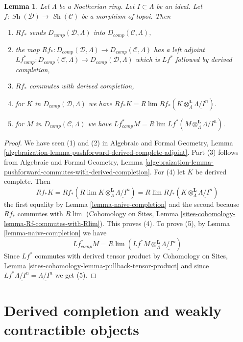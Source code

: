 \documentclass{stacks-project}
\theoremstyle{plain}
\newtheorem{lemma}[subsection]{Lemma}
\theoremstyle{definition}
\theoremstyle{remark}
\numberwithin{equation}{subsection}
\def\lim{\mathop{\mathrm{lim}}\nolimits}
\def\Sh{\mathop{\mathit{Sh}}\nolimits}
\begin{document}
\begin{lemma}
\label{lemma-pushforward-Noetherian-case}
Let $\Lambda$ be a Noetherian ring. Let $I \subset \Lambda$ be an ideal.
Let $f : \Sh(\mathcal{D}) \to \Sh(\mathcal{C})$ be a morphism of topoi.
Then
\begin{enumerate}
\item $Rf_*$ sends $D_{comp}(\mathcal{D}, \Lambda)$
into $D_{comp}(\mathcal{C}, \Lambda)$,
\item the map $Rf_* : D_{comp}(\mathcal{D}, \Lambda) \to
D_{comp}(\mathcal{C}, \Lambda)$ has a left adjoint
$Lf_{comp}^* : D_{comp}(\mathcal{C}, \Lambda) \to
D_{comp}(\mathcal{D}, \Lambda)$ which is $Lf^*$ followed by
derived completion,
\item $Rf_*$ commutes with derived completion,
\item for $K$ in $D_{comp}(\mathcal{D}, \Lambda)$ we have
$Rf_*K = R\lim Rf_*(K \otimes^\mathbf{L}_\Lambda \underline{\Lambda/I^n})$.
\item for $M$ in $D_{comp}(\mathcal{C}, \Lambda)$ we have
$Lf^*_{comp}M =
R\lim Lf^*(M \otimes^\mathbf{L}_\Lambda \underline{\Lambda/I^n})$.
\end{enumerate}
\end{lemma}

\begin{proof}
We have seen (1) and (2) in
Algebraic and Formal Geometry, Lemma
\ref{algebraization-lemma-pushforward-derived-complete-adjoint}.
Part (3) follows from
Algebraic and Formal Geometry, Lemma
\ref{algebraization-lemma-pushforward-commutes-with-derived-completion}.
For (4) let $K$ be derived complete. Then
$$
Rf_*K = Rf_*( R\lim K \otimes^\mathbf{L}_\Lambda \underline{\Lambda/I^n}) =
R\lim Rf_*(K \otimes^\mathbf{L}_\Lambda \underline{\Lambda/I^n})
$$
the first equality by Lemma \ref{lemma-naive-completion}
and the second because $Rf_*$ commutes with $R\lim$
(Cohomology on Sites, Lemma
\ref{sites-cohomology-lemma-Rf-commutes-with-Rlim}). This proves (4).
To prove (5), by Lemma \ref{lemma-naive-completion} we have
$$
Lf_{comp}^*M =
R\lim ( Lf^*M \otimes_\Lambda^\mathbf{L} \underline{\Lambda/I^n})
$$
Since $Lf^*$ commutes with derived tensor product by
Cohomology on Sites, Lemma \ref{sites-cohomology-lemma-pullback-tensor-product}
and since $Lf^*\underline{\Lambda/I^n} = \underline{\Lambda/I^n}$
we get (5).
\end{proof}







\section{Derived completion and weakly contractible objects}
\label{section-derived-completion-proetale}
\end{document}
